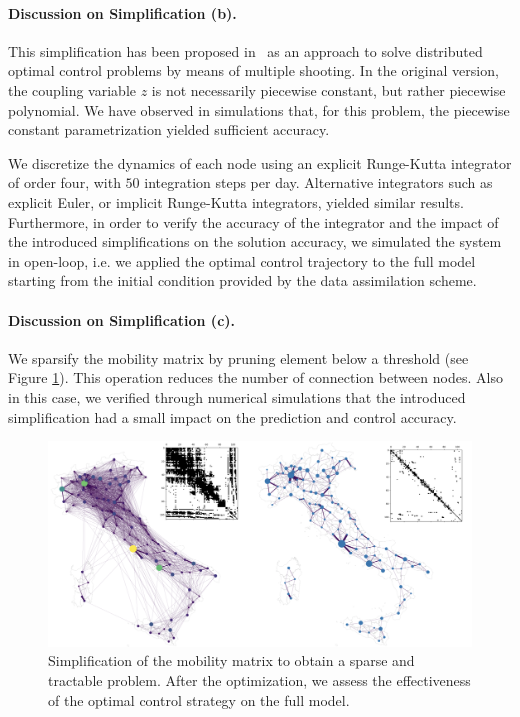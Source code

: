 \paragraph{Discussion on Simplification (b).}
This simplification has been proposed in~\cite{Savorgnan:MultipleShootingDistributed:2011} as an approach to solve distributed optimal control problems by means of multiple shooting. In the original version, the coupling variable $z$ is not necessarily piecewise constant, but rather piecewise polynomial. We have observed in simulations that, for this problem, the piecewise constant parametrization yielded sufficient accuracy.

We discretize the dynamics of each node using an explicit Runge-Kutta integrator of order four, with $50$ integration steps per day. Alternative integrators such as explicit Euler, or implicit Runge-Kutta integrators, yielded similar results. Furthermore, in order to verify the accuracy of the integrator and the impact of the introduced simplifications on the solution accuracy, we simulated the system in open-loop, i.e. we applied the optimal control trajectory to the full model starting from the initial condition provided by the data assimilation scheme.

\paragraph{Discussion on Simplification (c).} We sparsify the mobility matrix by pruning element below a threshold (see Figure \ref{figSI:mobility_simplification}). This operation reduces the number of connection between nodes. Also in this case, we verified through numerical simulations that the introduced simplification had a small impact on the prediction and control accuracy.

\begin{figure}
\centering
\includegraphics[width=\textwidth]{fig_italy-ocp/figuresSI/mobsimplification.png}
\caption[Simplification of the mobility matrix to obtain a sparse and tractable problem]{Simplification of the mobility matrix to obtain a sparse and tractable problem. After the optimization, we assess the effectiveness of the optimal control strategy on the full model.} \label{figSI:mobility_simplification}
\end{figure}

